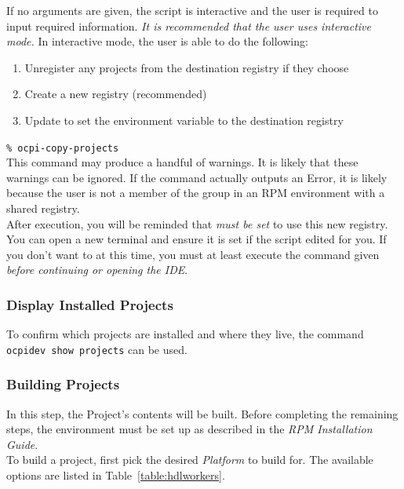 If no arguments are given, the script is interactive and the user is required to
input required information. \textit{It is recommended that the user uses interactive mode.} In interactive mode, the user is able to do the
following:
\begin{enumerate}
\item Unregister any projects from the destination registry if they choose
\item Create a new registry (recommended)
\item Update  to set the environment variable  to the destination registry
\end{enumerate}

\verb+% ocpi-copy-projects+ \\

This command may produce a handful of warnings. It is likely that these warnings can be ignored. If the command actually outputs an Error, it is likely because the user is not a member of the  group in an RPM environment with a shared registry.\\

After execution, you will be reminded that  \textit{must be set} to use this new registry. You can open a new terminal and ensure it is set if the script edited  for you.
If you don't want to at this time, you must at least execute the  command given \textit{before continuing or opening the IDE}.\\

\subsubsection{Display Installed Projects}
To confirm which projects are installed and where they live, the command \texttt{ocpidev show projects} can be used.
\subsubsection{Building Projects}
\label{subsubsec:buildworkers}
In this step, the Project's contents will be built. Before completing the remaining steps, the environment must be set up as described in the \textit{RPM Installation Guide}.\\

To build a project, first pick the desired \textit{Platform} to build for. The available options are listed in Table~\ref{table:hdlworkers}.\\

